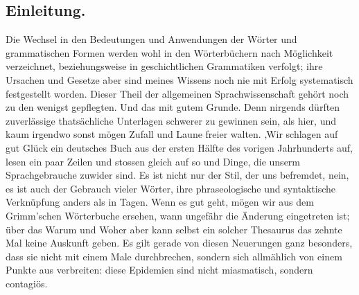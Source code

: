 {\subsection*{Einleitung.}
Die Wechsel in den Bedeutungen und Anwendungen der Wörter und grammatischen Formen werden wohl in den Wörterbüchern nach Möglichkeit verzeichnet, beziehungsweise in geschichtlichen Grammatiken verfolgt; ihre Ursachen und Gesetze aber sind meines Wissens noch nie mit Erfolg systematisch festgestellt worden. Dieser Theil der allgemeinen \label{fp.226} Sprachwissenschaft gehört noch zu den wenigst gepflegten. Und das mit gutem Grunde. Denn nirgends dürften zuverlässige thatsächliche Unterlagen schwerer zu gewinnen sein, als hier, und kaum irgendwo sonst mögen Zufall und Laune freier walten. ‚Wir schlagen auf gut Glück ein deutsches Buch aus der ersten Hälfte des vorigen Jahrhunderts \label{sp.228} auf, lesen ein paar Zeilen und stossen gleich auf so und  Dinge, die unserm Sprachgebrauche zuwider sind. Es ist nicht nur der Stil, der uns befremdet, nein, es ist auch der Gebrauch vieler Wörter, ihre phraseologische und syntaktische Verknüpfung anders als in  Tagen. Wenn es gut geht, mögen wir aus dem Grimm’schen Wörterbuche ersehen, wann ungefähr die Änderung eingetreten ist; über das Warum und Woher aber kann selbst ein solcher Thesaurus das zehnte Mal keine Auskunft geben. Es gilt gerade von diesen Neuerungen ganz besonders, dass sie nicht mit einem Male durchbrechen, sondern sich allmählich von einem Punkte aus verbreiten: diese Epidemien sind nicht miasmatisch, sondern contagiös.


}
